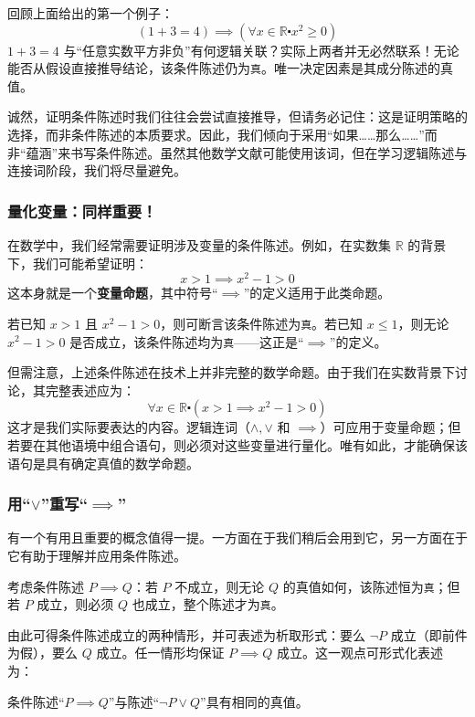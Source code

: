 回顾上面给出的第一个例子：
\[(1 + 3 = 4) \implies (\forall x \in \mathbb{R} \centerdot x^2 \ge 0)\]
$1+3=4$ 与``任意实数平方非负''有何逻辑关联？实际上两者并无必然联系！无论能否从假设直接推导结论，该条件陈述仍为\verb|真|。唯一决定因素是其成分陈述的真值。

诚然，证明条件陈述时我们往往会尝试直接推导，但请务必记住：这是证明策略的选择，而非条件陈述的本质要求。因此，我们倾向于采用``如果……那么……''而非``蕴涵''来书写条件陈述。虽然其他数学文献可能使用该词，但在学习逻辑陈述与连接词阶段，我们将尽量避免。

\subsubsection*{量化变量：同样重要！}

在数学中，我们经常需要证明涉及变量的条件陈述。例如，在实数集 $\mathbb{R}$ 的背景下，我们可能希望证明：
\[x > 1 \implies x^2 - 1 > 0\]
这本身就是一个\textbf{变量命题}，其中符号``$\implies$''的定义适用于此类命题。

若已知 $x > 1$ 且 $x^2 - 1 > 0$，则可断言该条件陈述为\verb|真|。若已知 $x \le 1$，则无论 $x^2 - 1 > 0$ 是否成立，该条件陈述均为\verb|真|——这正是``$\implies$''的定义。

但需注意，上述条件陈述在技术上并非完整的数学命题。由于我们在实数背景下讨论，其完整表述应为：
\[\forall x \in \mathbb{R} \centerdot (x > 1 \implies x^2 - 1 > 0)\]
这才是我们实际要表达的内容。逻辑连词（$\land , \lor$ 和 $\implies$）可应用于变量命题；但若要在其他语境中组合语句，则必须对这些变量进行量化。唯有如此，才能确保该语句是具有确定真值的数学命题。

\subsubsection*{用``$\lor$''重写``$\implies$''}

有一个有用且重要的概念值得一提。一方面在于我们稍后会用到它，另一方面在于它有助于理解并应用条件陈述。

考虑条件陈述 $P \implies Q$：若 $P$ 不成立，则无论 $Q$ 的真值如何，该陈述恒为\verb|真|；但若 $P$ 成立，则必须 $Q$ 也成立，整个陈述才为\verb|真|。

由此可得条件陈述成立的两种情形，并可表述为析取形式：要么 $\neg P$ 成立（即前件为假），要么 $Q$ 成立。任一情形均保证 $P \implies Q$ 成立。这一观点可形式化表述为：

\begin{center}
    条件陈述``$P \implies Q$''与陈述``$\neg P \lor Q$''具有相同的真值。
\end{center}

